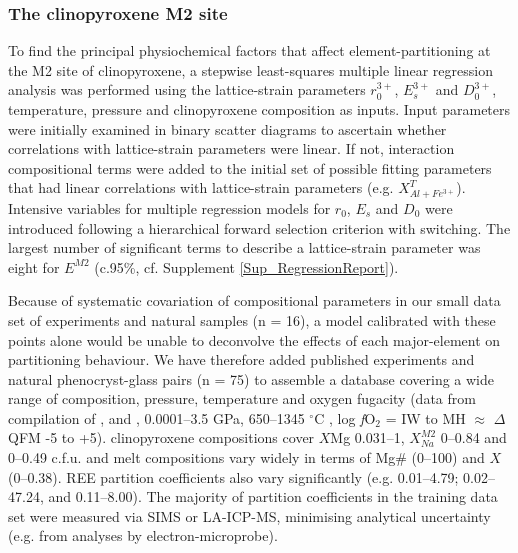 \documentclass[final,authoryear,3p,times,twocolumn]{elsarticle}
\newcommand{\dgC}{$^\circ$C }
\newcommand{\fO}{\textit{f}O$_{2}$ }
\begin{document}

	
\subsubsection{The clinopyroxene M2 site}		
	To find the principal physiochemical factors that affect element-partitioning at the M2 site of clinopyroxene, a stepwise least-squares multiple linear regression analysis was performed using the lattice-strain parameters $r_0^{3+}$, $E_s^{3+}$ and $D_0^{3+}$, temperature, pressure and clinopyroxene composition as inputs. Input parameters were initially examined in binary scatter diagrams to ascertain whether correlations with lattice-strain parameters were linear. If not, interaction compositional terms were added to the initial set of possible fitting parameters that had linear correlations with lattice-strain parameters (e.g. $X^{T}_{Al + Fe^{3+}}$). Intensive variables for multiple regression models for $r_0$, $E_s$ and $D_0$ were introduced following a hierarchical forward selection criterion with switching. The largest number of significant terms to describe a lattice-strain parameter was eight for $E^{M2}$ (c.95\%, cf. Supplement \ref{Sup_RegressionReport}).
		
	Because of systematic covariation of compositional parameters in our small data set of experiments and natural samples (n = 16), a model calibrated with these points alone would be unable to deconvolve the effects of each major-element on partitioning behaviour. We have therefore added published experiments and natural phenocryst-glass pairs (n = 75) to assemble a database covering a wide range of composition, pressure, temperature and oxygen fugacity (data from compilation of \citealt{Bedard2014}, and \citealt{Mollo2016}, 0.0001--3.5 GPa, 650--1345 \dgC, log \fO = IW to MH $\approx$ $\Delta$QFM -5 to +5). clinopyroxene compositions cover $X$Mg 0.031--1, $X_{Na}^{M2}$ 0--0.84 and  0--0.49 c.f.u. and melt compositions vary widely in terms of Mg\# (0--100) and $X$ (0--0.38).
	 REE partition coefficients also vary significantly (e.g.  0.01--4.79;  0.02--47.24, and  0.11--8.00). The majority of partition coefficients in the training data set were measured via SIMS or LA-ICP-MS, minimising analytical uncertainty (e.g. from analyses by electron-microprobe).
\end{document}
